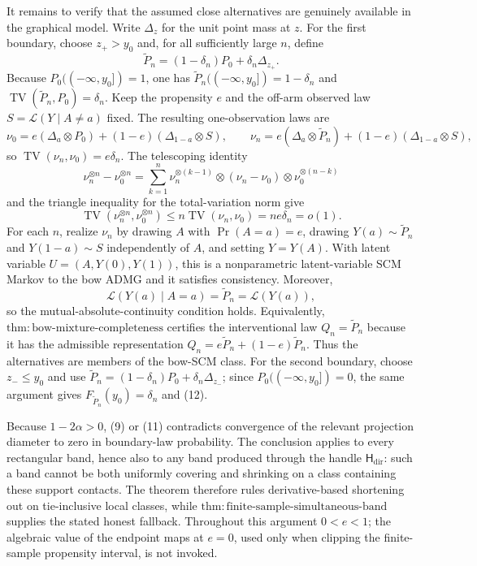 It remains to verify that the assumed close alternatives are genuinely available in the graphical model.  Write \(\Delta_z\) for the unit point mass at \(z\).  For the first boundary, choose \(z_+>y_0\) and, for all sufficiently large \(n\), define
\[
 \widetilde P_n=(1-\delta_n)P_0+\delta_n\Delta_{z_+}.
\]
Because \(P_0(({-}\infty,y_0])=1\), one has \(\widetilde P_n(({-}\infty,y_0])=1-\delta_n\) and \(\operatorname{TV}(\widetilde P_n,P_0)=\delta_n\).  Keep the propensity \(e\) and the off-arm observed law \(S=\mathcal L(Y\mid A\ne a)\) fixed.  The resulting one-observation laws are
\[
 \nu_0=e(\Delta_a\otimes P_0)+(1-e)(\Delta_{1-a}\otimes S),
 \qquad
 \nu_n=e(\Delta_a\otimes\widetilde P_n)+(1-e)(\Delta_{1-a}\otimes S),
\]
so \(\operatorname{TV}(\nu_n,\nu_0)=e\delta_n\).  The telescoping identity
\[
 \nu_n^{\otimes n}-\nu_0^{\otimes n}
 =\sum_{k=1}^n
 \nu_n^{\otimes(k-1)}\otimes(\nu_n-\nu_0)
 \otimes\nu_0^{\otimes(n-k)}
\]
and the triangle inequality for the total-variation norm give
\[
 \operatorname{TV}(\nu_n^{\otimes n},\nu_0^{\otimes n})
 \le n\operatorname{TV}(\nu_n,\nu_0)
 =ne\delta_n=o(1). \tag{12}
\]
For each \(n\), realize \(\nu_n\) by drawing \(A\) with \(\Pr(A=a)=e\), drawing \(Y(a)\sim\widetilde P_n\) and \(Y(1-a)\sim S\) independently of \(A\), and setting \(Y=Y(A)\).  With latent variable \(U=(A,Y(0),Y(1))\), this is a nonparametric latent-variable SCM Markov to the bow ADMG and it satisfies consistency.  Moreover,
\[
 \mathcal L(Y(a)\mid A=a)=\widetilde P_n
 =\mathcal L(Y(a)),
\]
so the mutual-absolute-continuity condition holds.  Equivalently, \(\mathrm{thm:bow\text{-}mixture\text{-}completeness}\) certifies the interventional law \(Q_n=\widetilde P_n\) because it has the admissible representation \(Q_n=e\widetilde P_n+(1-e)\widetilde P_n\).  Thus the alternatives are members of the bow-SCM class.  For the second boundary, choose \(z_-\le y_0\) and use \(\widetilde P_n=(1-\delta_n)P_0+\delta_n\Delta_{z_-}\); since \(P_0(({-}\infty,y_0])=0\), the same argument gives \(F_{\widetilde P_n}(y_0)=\delta_n\) and (12).

Because \(1-2\alpha>0\), (9) or (11) contradicts convergence of the relevant projection diameter to zero in boundary-law probability.  The conclusion applies to every rectangular band, hence also to any band produced through the handle \(\mathsf H_{\mathrm{dir}}\): such a band cannot be both uniformly covering and shrinking on a class containing these support contacts.  The theorem therefore rules derivative-based shortening out on tie-inclusive local classes, while \(\mathrm{thm:finite\text{-}sample\text{-}simultaneous\text{-}band}\) supplies the stated honest fallback.  Throughout this argument \(0<e<1\); the algebraic value of the endpoint maps at \(e=0\), used only when clipping the finite-sample propensity interval, is not invoked.